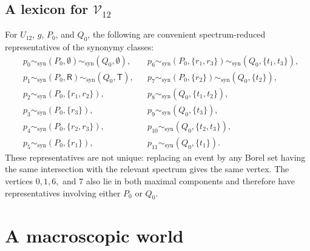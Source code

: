 \documentclass{article}   	%
\theoremstyle{plain}
\theoremstyle{definition}
\theoremstyle{remark}
\begin{document}
\subsection{A lexicon for $\mathcal V_{12}$}
\label{sec:lexicon}

For $U_{12}$, $g$, $P_0$, and $Q_0$, the following are convenient
spectrum-reduced representatives of the synonymy classes:
\begin{align*}
&p_0\sim_{\mathrm{syn}}(P_0,\emptyset)
      \sim_{\mathrm{syn}}(Q_0,\emptyset),
&&p_6\sim_{\mathrm{syn}}(P_0,\{r_1,r_3\})
      \sim_{\mathrm{syn}}(Q_0,\{t_1,t_3\}),\\
&p_1\sim_{\mathrm{syn}}(P_0,\mathsf R)
      \sim_{\mathrm{syn}}(Q_0,\mathsf T),
&&p_7\sim_{\mathrm{syn}}(P_0,\{r_2\})
      \sim_{\mathrm{syn}}(Q_0,\{t_2\}),\\
&p_2\sim_{\mathrm{syn}}(P_0,\{r_1,r_2\}),
&&p_8\sim_{\mathrm{syn}}(Q_0,\{t_1,t_2\}),\\
&p_3\sim_{\mathrm{syn}}(P_0,\{r_3\}),
&&p_9\sim_{\mathrm{syn}}(Q_0,\{t_3\}),\\
&p_4\sim_{\mathrm{syn}}(P_0,\{r_2,r_3\}),
&&p_{10}\sim_{\mathrm{syn}}(Q_0,\{t_2,t_3\}),\\
&p_5\sim_{\mathrm{syn}}(P_0,\{r_1\}),
&&p_{11}\sim_{\mathrm{syn}}(Q_0,\{t_1\}).
\end{align*}
These representatives are not unique: replacing an event by any Borel set
having the same intersection with the relevant spectrum gives the same vertex.
The vertices $0,1,6,$ and $7$ also lie in both maximal components and therefore
have representatives involving either $P_0$ or $Q_0$.

\section{A macroscopic world}
\label{macw}
\end{document}
